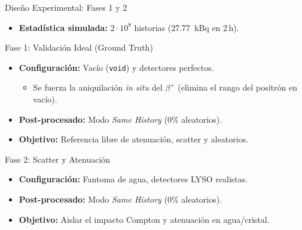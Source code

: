 \documentclass[aspectratio=169]{beamer}
\newcommand{\ingles}[1]{\textit{#1}\xspace}
\begin{document}
\begin{frame}{Diseño Experimental: Fases 1 y 2}
    \begin{itemize}
        \item \textbf{Estadística simulada:} $2\cdot 10^8$ historias (\SI{27.77}{\kilo\becquerel} en 2\,h).
    \end{itemize}
    \vspace{-0.1cm}
    \begin{block}{Fase 1: Validación Ideal (Ground Truth)}
        \begin{itemize}
            \item \textbf{Configuración:} Vacío (\texttt{void}) y detectores perfectos.
                  \begin{itemize}
                      \item \scriptsize Se fuerza la aniquilación \textit{in situ} del $\beta^+$ (elimina el rango del positrón en vacío).
                  \end{itemize}
            \item \textbf{Post-procesado:} Modo \ingles{Same History} ($0\%$ aleatorios).
            \item \textbf{Objetivo:} Referencia libre de atenuación, scatter y aleatorios.
        \end{itemize}
    \end{block}
    \begin{block}{Fase 2: Scatter y Atenuación}
        \begin{itemize}
            \item \textbf{Configuración:} Fantoma de agua, detectores LYSO realistas.
            \item \textbf{Post-procesado:} Modo \ingles{Same History} ($0\%$ aleatorios).
            \item \textbf{Objetivo:} Aislar el impacto Compton y atenuación en agua/cristal.
        \end{itemize}
    \end{block}
\end{frame}
\end{document}
